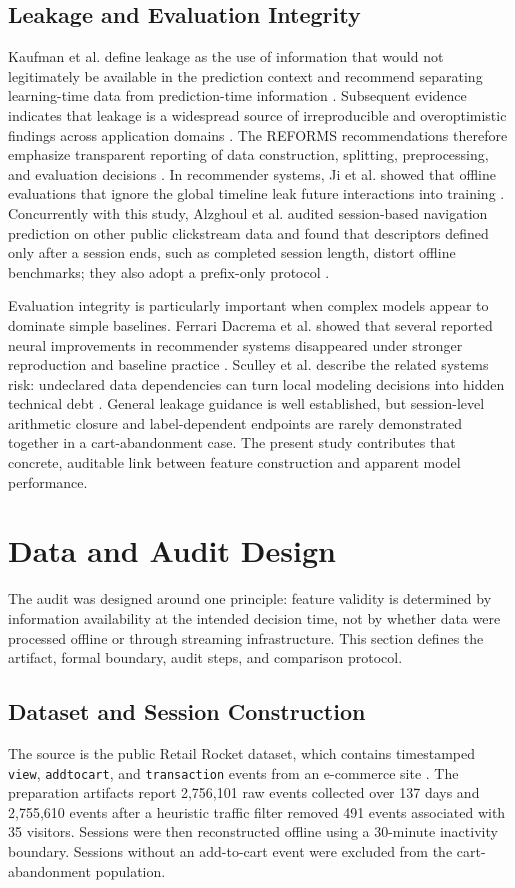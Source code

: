 \documentclass[conference, letterpaper]{IEEEtran}
\begin{document}
\subsection{Leakage and Evaluation Integrity}
Kaufman et al. define leakage as the use of information that would not legitimately be available in the prediction context and recommend separating learning-time data from prediction-time information \cite{kaufman2012}. Subsequent evidence indicates that leakage is a widespread source of irreproducible and overoptimistic findings across application domains \cite{kapoor2023}. The REFORMS recommendations therefore emphasize transparent reporting of data construction, splitting, preprocessing, and evaluation decisions \cite{reforms2024}. In recommender systems, Ji et al. showed that offline evaluations that ignore the global timeline leak future interactions into training \cite{ji2023}. Concurrently with this study, Alzghoul et al. audited session-based navigation prediction on other public clickstream data and found that descriptors defined only after a session ends, such as completed session length, distort offline benchmarks; they also adopt a prefix-only protocol \cite{alzghoul2026}.

Evaluation integrity is particularly important when complex models appear to dominate simple baselines. Ferrari Dacrema et al. showed that several reported neural improvements in recommender systems disappeared under stronger reproduction and baseline practice \cite{dacrema2019}. Sculley et al. describe the related systems risk: undeclared data dependencies can turn local modeling decisions into hidden technical debt \cite{sculley2015}. General leakage guidance is well established, but session-level arithmetic closure and label-dependent endpoints are rarely demonstrated together in a cart-abandonment case. The present study contributes that concrete, auditable link between feature construction and apparent model performance.

\section{Data and Audit Design}
The audit was designed around one principle: feature validity is determined by information availability at the intended decision time, not by whether data were processed offline or through streaming infrastructure. This section defines the artifact, formal boundary, audit steps, and comparison protocol.

\subsection{Dataset and Session Construction}
The source is the public Retail Rocket dataset, which contains timestamped \texttt{view}, \texttt{addtocart}, and \texttt{transaction} events from an e-commerce site \cite{retailrocket2015}. The preparation artifacts report 2,756,101 raw events collected over 137 days and 2,755,610 events after a heuristic traffic filter removed 491 events associated with 35 visitors. Sessions were then reconstructed offline using a 30-minute inactivity boundary. Sessions without an add-to-cart event were excluded from the cart-abandonment population.
\end{document}
